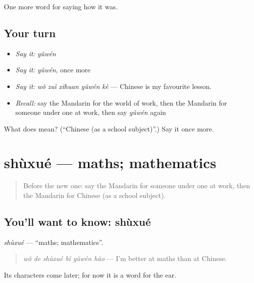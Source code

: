 \begin{grammarlens}[title={What you've built}]
One more word for saying how it was.
\end{grammarlens}

\subsection*{Your turn}
\begin{itemize}
\raggedright
  \item \emph{Say it:} \emph{yǔwén}
  \item \emph{Say it:} \emph{yǔwén}, once more
  \item \emph{Say it:} \emph{wǒ zuì xǐhuan yǔwén kè} — Chinese is my favourite lesson.
  \item \emph{Recall:} say the Mandarin for the world of work, then the Mandarin for someone under one at work, then say \emph{yǔwén} again
\end{itemize}

\begin{tcolorbox}[breakable,colback=teal!4,colframe=teal!35!black,title={Before you move on}]
What does  mean? (\textquotedblleft{}Chinese (as a school subject)\textquotedblright{}.) Say it once more.
\end{tcolorbox}
\section[shùxué]{shùxué — maths; mathematics}

\label{lesson:ZH-C492-shuxue}



\begin{quote}
Before the new one: say the Mandarin for someone under one at work, then the Mandarin for Chinese (as a school subject).
\end{quote}

\subsection*{You'll want to know: shùxué}
\emph{shùxué} — \textquotedblleft{}maths; mathematics\textquotedblright{}.

\begin{quote}
\emph{wǒ de shùxué bǐ yǔwén hǎo} — I'm better at maths than at Chinese.
\end{quote}

Its characters come later; for now it is a word for the ear.

